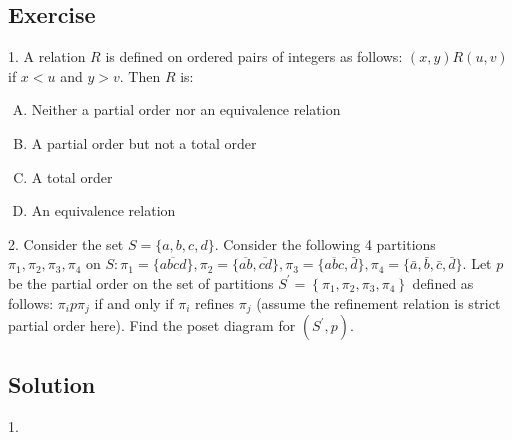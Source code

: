 \documentclass[12pt]{article}
\begin{document}
\subsection{Exercise}
	1. A relation $R$ is defined on ordered pairs of integers as follows: $(x,y) R(u,v)$ if $x < u$ and $y > v$. Then $R$ is:
	\begin{enumerate}[(A)]
		\item Neither a partial order nor an equivalence relation
		\item A partial order but not a total order
		\item A total order
		\item An equivalence relation
	\end{enumerate}
	\par 
	2. Consider the set $S=\{a, b, c, d\} .$ Consider the following 4 partitions $\pi_{1}, \pi_{2}, \pi_{3}, \pi_{4}$ on $S: \pi_{1}=\{\overline{a b c d}\}, \pi_{2}=\{\overline{a b}, \overline{c d}\}, \pi_{3}=\{\overline{a b c}, \bar{d}\}, \pi_{4}=\{\bar{a}, \bar{b}, \bar{c}, \bar{d}\} .$ Let $p$ be the partial order on the set of partitions $S^{\prime}=\left\{\pi_{1}, \pi_{2}, \pi_{3}, \pi_{4}\right\}$ defined as follows: $\pi_{i} p \pi_{j}$ if and only if $\pi_{i}$ refines $\pi_{j}$ (assume the refinement relation is strict partial order here). Find the poset diagram for $\left(S^{\prime}, p\right)$. 
\subsection{Solution}
	1.  
	
\end{document}
